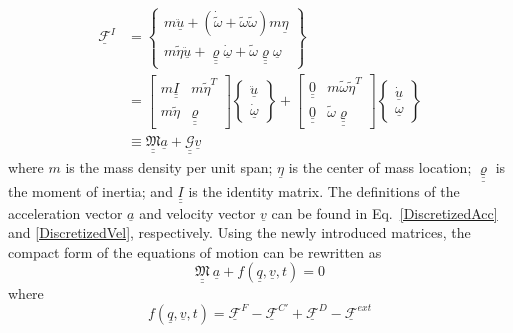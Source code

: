 \documentclass{aiaa-tc}
\newcommand{\tens}[1]{\underline{\underline{#1}}}
\begin{document}
\begin{align}
    \underline{\mathcal{F}}^I &= \begin{Bmatrix}
    m \ddot{\underline{u}} + ( \dot{\tilde{\omega}} + \tilde{\omega} \tilde{\omega} ) m \underline{\eta} \\
    m \tilde{\eta} \ddot{\underline{u}} + \underline{\underline{\varrho}} \dot{\underline{\omega}} + \tilde{\omega}  \underline{\underline{\varrho}} \underline{\omega} 
    \end{Bmatrix} \nonumber \\
    \label{InertialForce2}
    &= \begin{bmatrix}
    m \underline{\underline{I}} & m \tilde{\eta}^T \\
    m \tilde{\eta} & \underline{\underline{\varrho}}
    \end{bmatrix}
    \begin{Bmatrix}
    \ddot{\underline{u}} \\
    \dot{\underline{\omega}}
    \end{Bmatrix} + 
    \begin{bmatrix}
    \underline{\underline{0}} & m \tilde{\omega} \tilde{\eta}^T \\
    \underline{\underline{0}} & \tilde{\omega}  \underline{\underline{\varrho}}
    \end{bmatrix}
    \begin{Bmatrix}
    \dot{\underline{u}} \\
    \underline{\omega}
    \end{Bmatrix} \\
    &  \equiv \tens{\mathfrak{M}} \underline{a} + \underline{\underline{\mathcal{G}}} \underline{v}  \nonumber     
\end{align}
where $m$ is the mass density per unit span; $\underline{\eta}$ is the
center of mass location;  $\underline{\underline{\varrho}}$ is the moment of
inertia; and $\tens{I}$ is the identity matrix. The definitions of the acceleration vector $\underline{a}$ and velocity vector $\underline{v}$ can be found in Eq.~\eqref{DiscretizedAcc} and \eqref{DiscretizedVel}, respectively. Using the newly introduced matrices, the compact form of the equations of motion can be rewritten as
\begin{equation}
    \label{CompactForm2}
    \underline{\underline{\mathfrak{M}}}~ \underline{a} + f(\underline{q},\underline{v},t) = 0
\end{equation}
where
\begin{equation}
    \label{CompactForm3}
    f(\underline{q},\underline{v},t) = \underline{\mathcal{F}}^F - \underline{\mathcal{F}}^{C\prime} + \underline{\mathcal{F}}^D - \underline{\mathcal{F}}^{ext}
\end{equation}
\end{document}
